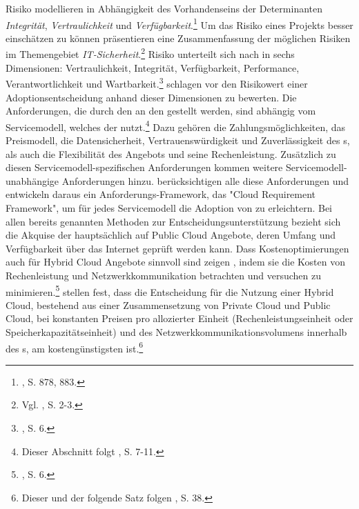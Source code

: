 Risiko modellieren \cite{Martens.2012} in Abhängigkeit des Vorhandenseins der Determinanten \emph{Integrität}, \emph{Vertraulichkeit} und \emph{Verfügbarkeit}.\footnote{\cite{Martens.2012}, S. 878, 883.}
\newline
Um das Risiko eines \CC Projekts besser einschätzen zu können präsentieren \cite{Ackermann.2012} eine Zusammenfassung der möglichen Risiken im Themengebiet \emph{IT-Sicherheit}.\footnote{Vgl. \cite{Ackermann.2012}, S. 2-3.}
Risiko unterteilt sich nach \cite{Ackermann.2012} in sechs Dimensionen: Vertraulichkeit, Integrität, Verfügbarkeit, Performance, Verantwortlichkeit und Wartbarkeit.\footnote{\cite{Ackermann.2012}, S. 6.}
\cite{Ackermann.2012} schlagen vor den Risikowert einer \CC Adoptionsentscheidung anhand dieser Dimensionen zu bewerten.
\newline
\newline
Die Anforderungen, die durch den \CSU an den \CS gestellt werden, sind abhängig vom Servicemodell, welches der \CS nutzt.\footnote{Dieser Abschnitt folgt \cite{Repschlaeger.2012}, S. 7-11.}
Dazu gehören die Zahlungsmöglichkeiten, das Preismodell, die Datensicherheit, Vertrauenswürdigkeit und Zuverlässigkeit des \Cs s, als auch die Flexibilität des Angebots und seine Rechenleistung.
Zusätzlich zu diesen Servicemodell-spezifischen Anforderungen kommen weitere Servicemodell-unabhängige Anforderungen hinzu. 
\cite{Repschlaeger.2012} berücksichtigen alle diese Anforderungen und entwickeln daraus ein Anforderungs-Framework, das "Cloud Requirement Framework", um für jedes Servicemodell die Adoption von \CSs zu erleichtern.
\newline
Bei allen bereits genannten Methoden zur Entscheidungsunterstützung bezieht sich die Akquise der \CSs hauptsächlich auf Public Cloud Angebote, deren Umfang und Verfügbarkeit über das Internet geprüft werden kann. Dass Kostenoptimierungen auch für Hybrid Cloud Angebote sinnvoll sind zeigen \cite{Mazhelis.2012}, indem sie die Kosten von Rechenleistung und Netzwerkkommunikation betrachten und versuchen zu minimieren.\footnote{\cite{Mazhelis.2012}, S. 6.}
\cite{Mazhelis.2012} stellen fest, dass die Entscheidung für die Nutzung einer Hybrid Cloud, bestehend aus einer Zusammensetzung von Private Cloud und Public Cloud, bei konstanten Preisen pro allozierter \CC Einheit (Rechenleistungseinheit oder Speicherkapazitätseinheit) und des Netzwerkkommunikationsvolumens innerhalb des \Cs s, am kostengünstigsten ist.\footnote{Dieser und der folgende Satz folgen \cite{Mazhelis.2012}, S. 38.}
